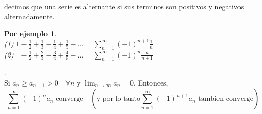 \documentclass{article}
\theoremstyle{definition}
\newtheorem*{ej}{Por ejemplo}
\theoremstyle{remark}
\begin{document}
\begin{defi}
  decimos que una serie es \underline{alternante} si sus terminos son positivos y negativos alternadamente. 
\end{defi}


\begin{ej} \; \\
  \emph{(1)} \quad $1-\frac{1}{2} + \frac{1}{3} - \frac{1}{4}+\frac{1}{5} - \dots = \sum_{n=1}^{\infty}{(-1)^{n+1}\frac{1}{n}}$ \\
  \emph{(2)} \quad $\phantom{1}-\frac{1}{2}+\frac{2}{3}-\frac{3}{4}+\frac{4}{5}-\dots = \sum_{n=1}^{\infty}{(-1)^{n}\frac{n}{n+1}}$
\end{ej}

\pagebreak

\begin{teo}. \; \\
  Si $a_n \geq a_{n+1} > 0 \quad \forall n$ y $\lim_{n\to\infty}{a_n}=0$.   Entonces, $$\sum_{n=1}^{\infty}{(-1)^{n}a_n} \text{ converge} \quad (\text{y por lo tanto} \sum_{n=1}^{\infty}{(-1)^{n+1}a_n} \text{ tambien converge}) $$
\end{teo}

\begin{figure}[h]
\centering
\def\svgwidth{0.75\textwidth}

\end{figure}
\end{document}
